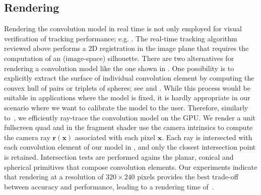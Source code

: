 \subsection{Rendering}
\label{sec:rendering}
Rendering the convolution model in real time is not only employed for visual verification of tracking performance; e.g. . The real-time tracking algorithm reviewed above performs a 2D registration in the image plane that requires the computation of an (image-space) silhouette. There are two alternatives for rendering a  convolution model like the one shown in . One possibility is to explicitly extract the surface of individual convolution element by computing the convex hull of pairs or triplets of spheres; see  and \cite{ando2013liquid}. While this process would be suitable in applications where the model is fixed, it is hardly appropriate in our scenario where we want to calibrate the model to the user. Therefore, similarly to~\cite{thiery2016spheremesh}, we efficiently ray-trace the convolution model on the GPU. We render a unit fullscreen quad and in the fragment shader use the camera intrinsics to compute the camera ray $\mathbf{r}(\mathbf{x})$ associated with each pixel $\mathbf{x}$. Each ray is intersected with each convolution element of our model in , and only the closest intersection point is retained. Intersection tests are performed agains the planar, conical and spherical primitives that compose convolution elements. 
% 
% 
Our experiments indicate that rendering at a resolution of $320 \times 240$ pixels provides the best trade-off between accuracy and performance, leading to a rendering time of~.






\endinput

